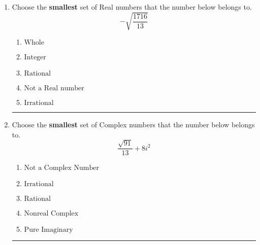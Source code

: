 \documentclass[14pt]{extbook}
\newcommand{\litem}[1]{\item#1\hspace*{-1cm}\rule{\textwidth}{0.4pt}}
\begin{document}
\begin{enumerate}
{\begin{enumerate}[label=\Alph*.]
\end{enumerate} }
\litem{
Choose the \textbf{smallest} set of Real numbers that the number below belongs to.\[ -\sqrt{\frac{1716}{13}} \]\begin{enumerate}[label=\Alph*.]
\item \( \text{Whole} \)
\item \( \text{Integer} \)
\item \( \text{Rational} \)
\item \( \text{Not a Real number} \)
\item \( \text{Irrational} \)

\end{enumerate} }
\litem{
Choose the \textbf{smallest} set of Complex numbers that the number below belongs to.\[ \frac{\sqrt{91}}{13}+8i^2 \]\begin{enumerate}[label=\Alph*.]
\item \( \text{Not a Complex Number} \)
\item \( \text{Irrational} \)
\item \( \text{Rational} \)
\item \( \text{Nonreal Complex} \)
\item \( \text{Pure Imaginary} \)

\end{enumerate} }
\end{enumerate}
\end{document}
